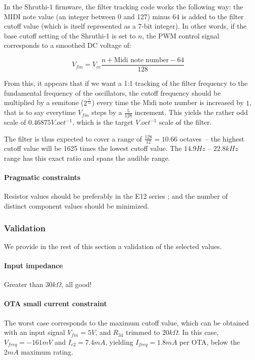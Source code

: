 \documentclass[a4paper,11pt]{article}
\begin{document}
In the Shruthi-1 firmware, the filter tracking code works the following way: the MIDI note value (an integer between 0 and 127) minus 64 is added to the filter cutoff value (which is itself represented as a 7-bit integer). In other words, if the base cutoff setting of the Shruthi-1 is set to $n$, the PWM control signal corresponds to a smoothed DC voltage of:

\begin{equation}
V_{fin} = V_{cc} \frac{n + \mbox{Midi note number} - 64}{128}
\end{equation}

From this, it appears that if we want a 1:1 tracking of the filter frequency to the fundamental frequency of the oscillators, the cutoff frequency should be multiplied by a semitone ($2^\frac{1}{12}$) every time the Midi note number is increased by $1$, that is to say everytime $V_{fin}$ steps by a $\frac{5}{128}$ increment. This yields the rather odd scale of $0.46875V.oct^{-1}$, which is the target $V.oct^{-1}$ scale of the filter.

The filter is thus expected to cover a range of $\frac{128}{12} = 10.66$ octaves~-- the highest cutoff value will be 1625 times the lowest cutoff value. The $14.9 Hz$ -- $22.8kHz$ range has this exact ratio and spans the audible range.

\paragraph{Pragmatic constraints} Resistor values should be preferably in the E12 series ; and the number of distinct component values should be minimized.

\subsubsection{Validation}

We provide in the rest of this section a validation of the selected values.

\paragraph{Input impedance} Greater than $30k\Omega$, all good!

\paragraph{OTA small current constraint} The worst case corresponds to the maximum cutoff value, which can be obtained with an input signal $V_{fin} = 5V$, and $R_{34}$ trimmed to $20k\Omega$. In this case, $V_{freq} = -161mV$ and $I_{c2} = 7.4mA$, yielding $I_{freq} = 1.8mA$ per OTA, below the $2mA$ maximum rating.
\end{document}

